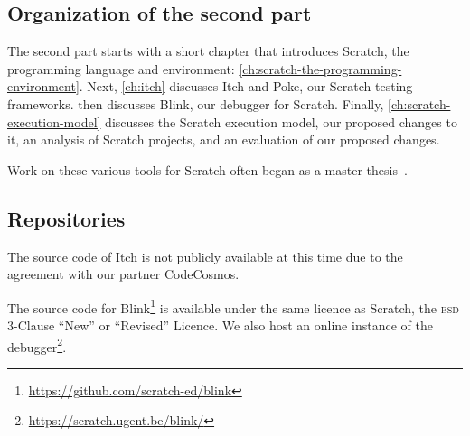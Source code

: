 \documentclass[../main]{subfiles}
\begin{document}
\subsection{Organization of the second part}\label{subsec:organization-of-the-second-part}

The second part starts with a short chapter that introduces Scratch, the programming language and environment: \cref{ch:scratch-the-programming-environment}.
Next, \cref{ch:itch} discusses Itch and Poke, our Scratch testing frameworks.
 then discusses Blink, our debugger for Scratch.
Finally, \cref{ch:scratch-execution-model} discusses the Scratch execution model, our proposed changes to it, an analysis of Scratch projects, and an evaluation of our proposed changes.

Work on these various tools for Scratch often began as a master thesis~\autocite{makItchEenEducatief2019,voetenEenBlokgebaseerdTestframework2023,goethalsEenTimeTravelling2023,deproftBlinkEenEducatieve2022}.

\subsection{Repositories}\label{subsec:repositories-and-code-scratch}

The source code of Itch is not publicly available at this time due to the agreement with our partner CodeCosmos.

The source code for Blink\footnote{\url{https://github.com/scratch-ed/blink}} is available under the same licence as Scratch, the \textsc{bsd} 3-Clause ``New'' or ``Revised'' Licence.
We also host an online instance of the debugger\footnote{\url{https://scratch.ugent.be/blink/}}.
\end{document}
